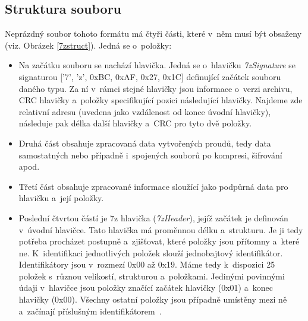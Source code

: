 \subsection{Struktura souboru}
\label{ssec:7z_struct}
Neprázdný soubor tohoto formátu má čtyři části, které v~něm musí být obsaženy (viz. Obrázek
\ref{7zstruct}). Jedná se o~položky: 
\begin{itemize}
    \item Na začátku souboru se nachází hlavička. Jedná se o~hlavičku {\it 7zSignature} se
	signaturou ['7', 'z', 0xBC, 0xAF, 0x27, 0x1C] definující začátek souboru daného typu.
	Za ní v~rámci stejné hlavičky jsou informace o~verzi archivu, CRC hlavičky a~položky
	specifikující pozici následující hlavičky. Najdeme zde relativní adresu (uvedena jako
	vzdálenost od konce úvodní hlavičky), následuje pak délka další hlavičky a~CRC pro tyto dvě
	položky.
    \item Druhá část obsahuje zpracovaná data vytvořených proudů, tedy data samostatných nebo
	případně i~spojených souborů po kompresi, šifrování apod.
    \item Třetí část obsahuje zpracované informace sloužící jako podpůrná data pro hlavičku a~její
	položky.
    \item Poslední čtvrtou částí je 7z hlavička ({\it 7zHeader}), jejíž začátek je definován
	v~úvodní hlavičce. Tato hlavička má proměnnou délku a~strukturu. Je ji tedy potřeba
	procházet postupně a~zjišťovat, které položky jsou přítomny a~které ne. K~identifikaci
	jednotlivých položek slouží jednobajtový identifikátor. Identifikátory jsou v~rozmezí 0x00
	až 0x19. Máme tedy k~dispozici 25 položek s~různou velikostí, strukturou a~položkami.
	Jedinými povinnými údaji v~hlavičce jsou položky značící začátek hlavičky (0x01) a~konec
	hlavičky (0x00). Všechny ostatní položky jsou případně umístěny mezi ně a~začínají
	příslušným identifikátorem~\cite{Pavlov:2010}. 
\end{itemize}
